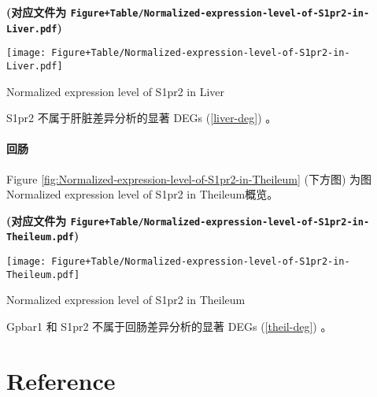 \documentclass[
]{article}
\begin{document}
\textbf{(对应文件为 \texttt{Figure+Table/Normalized-expression-level-of-S1pr2-in-Liver.pdf})}

\def\@captype{figure}
\begin{center}
\texttt{[image: Figure+Table/Normalized-expression-level-of-S1pr2-in-Liver.pdf]}
\caption{Normalized expression level of S1pr2 in Liver}\label{fig:Normalized-expression-level-of-S1pr2-in-Liver}
\end{center}

S1pr2 不属于肝脏差异分析的显著 DEGs (\ref{liver-deg}) 。

\hypertarget{ux56deux80a0}{%
\paragraph{回肠}\label{ux56deux80a0}}

Figure \ref{fig:Normalized-expression-level-of-S1pr2-in-Theileum} (下方图) 为图Normalized expression level of S1pr2 in Theileum概览。

\textbf{(对应文件为 \texttt{Figure+Table/Normalized-expression-level-of-S1pr2-in-Theileum.pdf})}

\def\@captype{figure}
\begin{center}
\texttt{[image: Figure+Table/Normalized-expression-level-of-S1pr2-in-Theileum.pdf]}
\caption{Normalized expression level of S1pr2 in Theileum}\label{fig:Normalized-expression-level-of-S1pr2-in-Theileum}
\end{center}

Gpbar1 和 S1pr2 不属于回肠差异分析的显著 DEGs (\ref{theil-deg}) 。

\hypertarget{bibliography}{%
\section*{Reference}\label{bibliography}}
\end{document}
